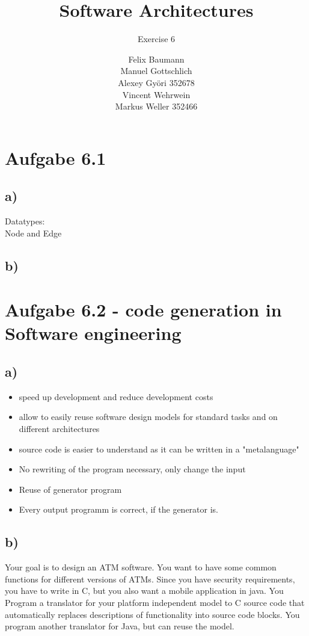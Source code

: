 \documentclass[a4paper,10pt]{scrartcl}[2003/01/01]
\title{Software Architectures}
\subtitle{Exercise 6}
\author{ Felix Baumann \\ Manuel Gottschlich \\  Alexey Gy\"ori 352678 \\ Vincent Wehrwein \\ Markus Weller 352466}
\begin{document}
    \maketitle
    
    \section*{Aufgabe 6.1}
        \subsection*{a)}
        Datatypes:\\
        Node and Edge
        \subsection*{b)}
    \section*{Aufgabe 6.2 - code generation in Software engineering}
        \subsection*{a)}
        	\begin{itemize}
        		\item speed up development and reduce development costs
        		\item allow to easily reuse software design models for standard tasks and on different architectures
        		\item source code is easier to understand as it can be written in a "metalanguage"
        		\item No rewriting of the program necessary, only change the input
                \item Reuse of generator program
                \item Every output programm is correct, if the generator is.
        \end{itemize}
        \subsection*{b)}
        	Your goal is to design an ATM software. You want to have some common functions for different versions of ATMs. Since you have security requirements, you have to write in C, but you also want a mobile application in java. You Program a translator for your platform independent model to C source code that automatically replaces descriptions of functionality into source code blocks. You program another translator for Java, but can reuse the model.
        
\end{document}
